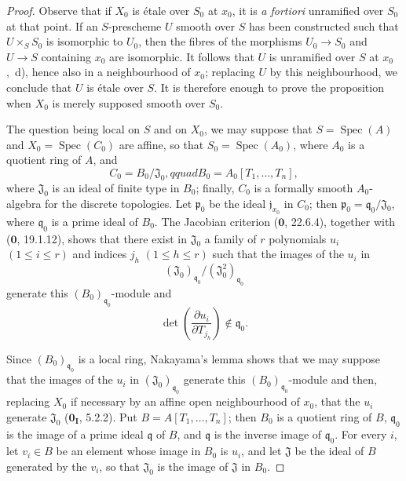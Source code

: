 \begin{proof}
Observe that if $X_0$ is \'etale over $S_0$ at $x_0$, it is \emph{a fortiori} unramified over $S_0$ at that point.  If an $S$-prescheme $U$ smooth over $S$ has been constructed such that $U\times_SS_0$ is isomorphic to $U_0$, then the fibres of the morphisms $U_0\to S_0$ and $U\to S$ containing $x_0$ are isomorphic.  It follows that $U$ is unramified over $S$ at $x_0$ ,~d), hence also in a neighbourhood of $x_0$; replacing $U$ by this neighbourhood, we conclude that $U$ is \'etale over $S$.  It is therefore enough to prove the proposition when $X_0$ is merely supposed smooth over $S_0$.

The question being local on $S$ and on $X_0$, we may suppose that $S=\operatorname{Spec}(A)$ and $X_0=\operatorname{Spec}(C_0)$ are affine, so that $S_0=\operatorname{Spec}(A_0)$, where $A_0$ is a quotient ring of $A$, and
\[
 C_0=B_0/\mathfrak{J}_0,qquad B_0=A_0[T_1,\ldots,T_n],
\]
where $\mathfrak{J}_0$ is an ideal of finite type in $B_0$; finally, $C_0$ is a formally smooth $A_0$-algebra for the discrete topologies.  Let $\mathfrak p_0$ be the ideal $\mathfrak j_{x_0}$ in $C_0$; then $\mathfrak p_0=\mathfrak q_0/\mathfrak{J}_0$, where $\mathfrak q_0$ is a prime ideal of $B_0$.  The Jacobian criterion ($\mathbf{0}$, 22.6.4), together with ($\mathbf{0}$, 19.1.12), shows that there exist in $\mathfrak{J}_0$ a family of $r$ polynomials $u_i$ $(1\leq i\leq r)$ and indices $j_h$ $(1\leq h\leq r)$ such that the images of the $u_i$ in
\[
 (\mathfrak{J}_0)_{\mathfrak q_0}/(\mathfrak{J}_0^2)_{\mathfrak q_0}
\]
generate this $(B_0)_{\mathfrak q_0}$-module and
\begin{equation}
 \det\left(\frac{\partial u_i}{\partial T_{j_h}}\right)\notin\mathfrak q_0.
 \tag{18.1.1.1}\label{IV.18.1.1.1}
\end{equation}

Since $(B_0)_{\mathfrak q_0}$ is a local ring, Nakayama's lemma shows that we may suppose that the images of the $u_i$ in $(\mathfrak{J}_0)_{\mathfrak q_0}$ generate this $(B_0)_{\mathfrak q_0}$-module and then, replacing $X_0$ if necessary by an affine open neighbourhood of $x_0$, that the $u_i$ generate $\mathfrak{J}_0$ ($\mathbf{0}_{\mathbf I}$, 5.2.2).  Put $B=A[T_1,\ldots,T_n]$; then $B_0$ is a quotient ring of $B$, $\mathfrak q_0$ is the image of a prime ideal $\mathfrak q$ of $B$, and $\mathfrak q$ is the inverse image of $\mathfrak q_0$.  For every $i$, let $v_i\in B$ be an element whose image in $B_0$ is $u_i$, and let $\mathfrak{J}$ be the ideal of $B$ generated by the $v_i$, so that $\mathfrak{J}_0$ is the image of $\mathfrak{J}$ in $B_0$.


\end{proof}

